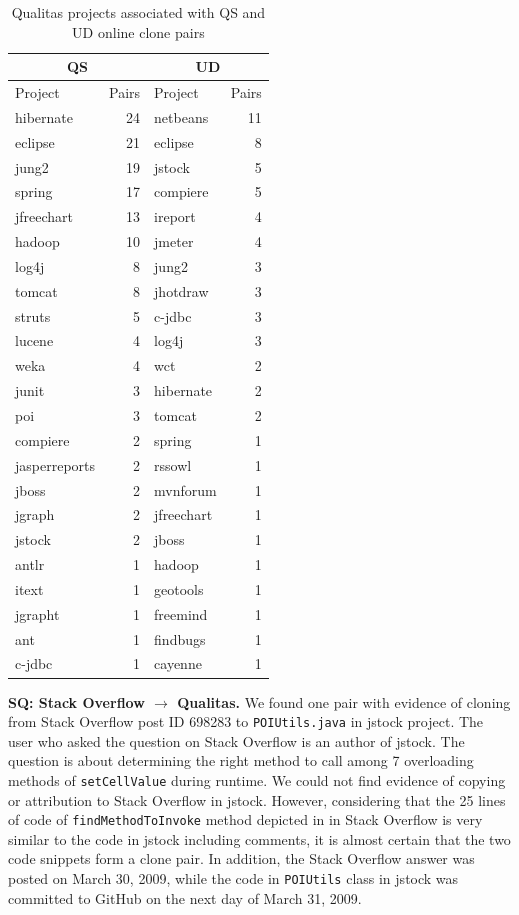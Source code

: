 \documentclass[10pt,journal,compsoc]{IEEEtran}
\begin{document}
\begin{table}
	\centering
	\caption{Qualitas projects associated with QS and UD online clone pairs}
	\label{tab:qs_qualitas_projects}
	\begin{tabular}{lrlr}
		\toprule
		\multicolumn{2}{c}{QS} & \multicolumn{2}{c}{UD} \\
		\midrule
		Project & Pairs & Project & Pairs\\
		\midrule
		hibernate & 24 & netbeans & 11 \\
		eclipse & 21 & eclipse & 8 \\
		jung2 & 19 & jstock & 5 \\
		spring & 17 & compiere & 5 \\
		jfreechart & 13 & ireport & 4 \\
		hadoop & 10 & jmeter & 4 \\
		log4j & 8 & jung2 & 3 \\
		tomcat & 8 & jhotdraw & 3 \\
		struts & 5 & c-jdbc & 3 \\
		lucene & 4 & log4j & 3 \\
		weka & 4 & wct & 2 \\
		junit & 3 & hibernate & 2 \\
		poi & 3 & tomcat & 2 \\
		compiere & 2 & spring & 1 \\
		jasperreports & 2 & rssowl & 1 \\
		jboss & 2 & mvnforum & 1 \\
		jgraph & 2 & jfreechart & 1 \\
		jstock & 2 & jboss & 1 \\
		antlr & 1 & hadoop & 1 \\
		itext & 1 & geotools & 1 \\
		jgrapht & 1 & freemind & 1 \\
		ant & 1 & findbugs & 1 \\
		c-jdbc & 1 & cayenne & 1 \\
		\bottomrule
	\end{tabular} 
\end{table}

\textbf{SQ: Stack Overflow $\rightarrow$ Qualitas.} We found one pair with
evidence of cloning from Stack Overflow post ID 698283 to
{\small\texttt{POIUtils.java}} in \textsf{jstock} project. The user
 who asked the question on Stack Overflow is an author of
\textsf{jstock}. The question is about determining the right method to call
among 7 overloading methods of {\small\texttt{setCellValue}} during runtime. We
could not find evidence of copying or attribution to Stack Overflow in
\textsf{jstock}. However, considering that the 25 lines of code of
{\small\texttt{findMethodToInvoke}} method depicted in  in Stack
Overflow is very similar to the code in \textsf{jstock} including comments, it is almost certain that
the two code snippets form a clone pair. In addition, the Stack Overflow answer was
posted on March 30, 2009, while the code in {\small\texttt{POIUtils}} class in
\textsf{jstock} was committed to GitHub on the next day of March 31, 2009.
\end{document}
